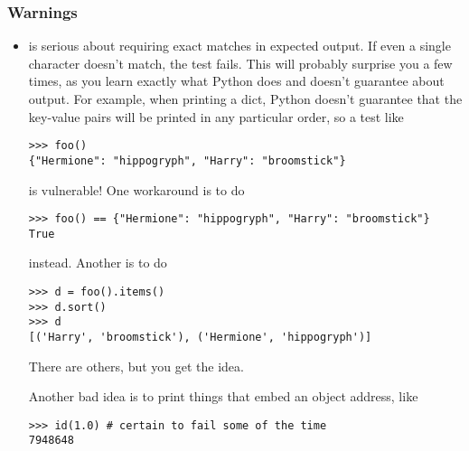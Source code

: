 
\subsubsection{Warnings\label{doctest-warnings}}

\begin{itemize}

\item {} is serious about requiring exact matches in expected
  output.  If even a single character doesn't match, the test fails.  This
  will probably surprise you a few times, as you learn exactly what Python
  does and doesn't guarantee about output.  For example, when printing a
  dict, Python doesn't guarantee that the key-value pairs will be printed
  in any particular order, so a test like

\begin{verbatim}
>>> foo()
{"Hermione": "hippogryph", "Harry": "broomstick"}
\end{verbatim}

is vulnerable!  One workaround is to do

\begin{verbatim}
>>> foo() == {"Hermione": "hippogryph", "Harry": "broomstick"}
True
\end{verbatim}

instead.  Another is to do

\begin{verbatim}
>>> d = foo().items()
>>> d.sort()
>>> d
[('Harry', 'broomstick'), ('Hermione', 'hippogryph')]
\end{verbatim}

There are others, but you get the idea.

Another bad idea is to print things that embed an object address, like

\begin{verbatim}
>>> id(1.0) # certain to fail some of the time
7948648
\end{verbatim}


\end{itemize}
